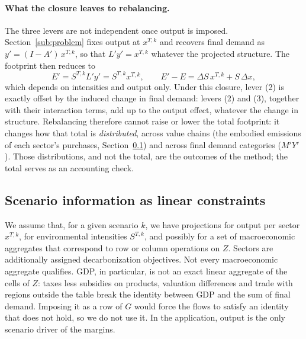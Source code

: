 \documentclass[11pt,a4paper]{article}
\begin{document}
\paragraph{What the closure leaves to rebalancing.}
The three levers are not independent once output is imposed. Section~\ref{sub:problem} fixes output at $x^{T,k}$ and recovers final demand as $y' = (I - A')\,x^{T,k}$, so that $L' y' = x^{T,k}$ whatever the projected structure. The footprint then reduces to
\begin{equation}\label{eq:fixed_total}
  E' = S^{T,k} L' y' = S^{T,k} x^{T,k},
  \qquad
  E' - E = \Delta S \, x^{T,k} + S \, \Delta x ,
\end{equation}
which depends on intensities and output only. Under this closure, lever (2) is exactly offset by the induced change in final demand: levers (2) and (3), together with their interaction terms, add up to the output effect, whatever the change in structure. Rebalancing therefore cannot raise or lower the total footprint: it changes how that total is \emph{distributed}, across value chains (the embodied emissions of each sector's purchases, Section~\ref{sub:constraints}) and across final demand categories ($M'Y'$). Those distributions, and not the total, are the outcomes of the method; the total serves as an accounting check.

\subsection{Scenario information as linear constraints}
\label{sub:constraints}

We assume that, for a given scenario $k$, we have projections for output per sector $x^{T,k}$, for environmental intensities $S^{T,k}$, and possibly for a set of macroeconomic aggregates that correspond to row or column operations on $Z$. Sectors are additionally assigned decarbonization objectives. Not every macroeconomic aggregate qualifies. GDP, in particular, is not an exact linear aggregate of the cells of $Z$: taxes less subsidies on products, valuation differences and trade with regions outside the table break the identity between GDP and the sum of final demand. Imposing it as a row of $G$ would force the flows to satisfy an identity that does not hold, so we do not use it. In the application, output is the only scenario driver of the margins.
\end{document}
